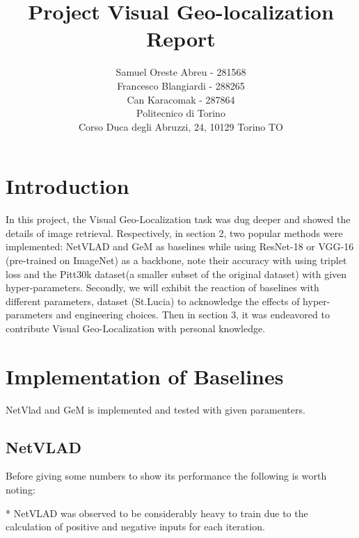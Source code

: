 \documentclass[10pt,twocolumn,letterpaper]{article}
\begin{document}
\title{ Project Visual Geo-localization Report}

\author{
Samuel Oreste Abreu - 281568\\
Francesco Blangiardi - 288265\\
Can Karacomak - 287864\\
Politecnico di Torino\\
Corso Duca degli Abruzzi, 24, 10129 Torino TO\\
}

\maketitle

\begin{abstract}

\end{abstract}

\section{Introduction}
\label{sec:intro}
In this project, the Visual Geo-Localization task was dug deeper and showed the details of image retrieval. Respectively, in section 2, two popular methods were implemented: NetVLAD and GeM as baselines while using ResNet-18 or VGG-16 (pre-trained on ImageNet) as a backbone, note their accuracy with using triplet loss and the Pitt30k dataset(a smaller subset of the original dataset) with given hyper-parameters. Secondly, we will exhibit the reaction of baselines with different parameters, dataset (St.Lucia) to acknowledge the effects of hyper-parameters and engineering choices. Then in section 3, it was endeavored to contribute Visual Geo-Localization with personal knowledge.


\section{Implementation of Baselines}
\label{sec:imp}
NetVlad and GeM is implemented and tested with given paramenters.

\subsection{NetVLAD}
Before giving some numbers to show its performance the following is worth noting:

* NetVLAD was observed to be considerably heavy to train due to the calculation of positive and negative inputs for each iteration.
\end{document}
